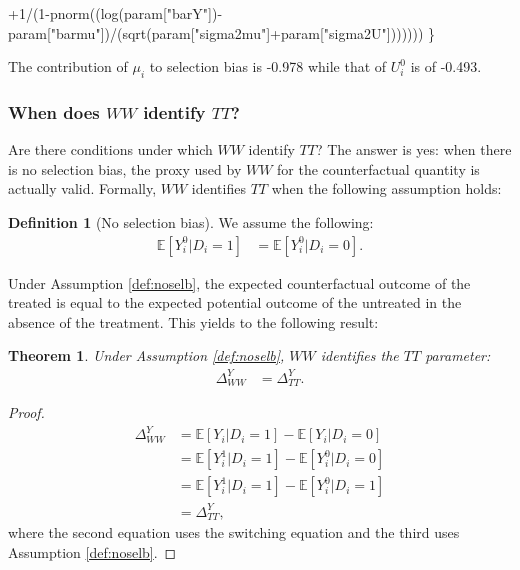 \documentclass[
]{book}
\newenvironment{Shaded}{\begin{snugshade}}{\end{snugshade}}
\newcommand{\DecValTok}[1]{\textcolor[rgb]{0.00,0.00,0.81}{#1}}
\newcommand{\FunctionTok}[1]{\textcolor[rgb]{0.00,0.00,0.00}{#1}}
\newcommand{\NormalTok}[1]{#1}
\newcommand{\SpecialCharTok}[1]{\textcolor[rgb]{0.00,0.00,0.00}{#1}}
\newcommand{\StringTok}[1]{\textcolor[rgb]{0.31,0.60,0.02}{#1}}
\newcommand{\esp}[1]{\mathbb{E}[ #1 ]}
\newtheorem{theorem}{Theorem}[chapter]
\theoremstyle{definition}
\newtheorem{definition}{Definition}[chapter]
\theoremstyle{definition}
\theoremstyle{definition}
\theoremstyle{definition}
\theoremstyle{remark}
\begin{document}
\begin{Shaded}
\begin{Highlighting}[]
           \SpecialCharTok{+}\DecValTok{1}\SpecialCharTok{/}\NormalTok{(}\DecValTok{1}\SpecialCharTok{{-}}\FunctionTok{pnorm}\NormalTok{((}\FunctionTok{log}\NormalTok{(param[}\StringTok{"barY"}\NormalTok{])}\SpecialCharTok{{-}}\NormalTok{param[}\StringTok{"barmu"}\NormalTok{])}\SpecialCharTok{/}\NormalTok{(}\FunctionTok{sqrt}\NormalTok{(param[}\StringTok{"sigma2mu"}\NormalTok{]}\SpecialCharTok{+}\NormalTok{param[}\StringTok{"sigma2U"}\NormalTok{]))))))}
\NormalTok{\}}
\end{Highlighting}
\end{Shaded}

The contribution of \(\mu_i\) to selection bias is -0.978 while that of \(U_i^0\) is of -0.493.

\hypertarget{when-does-ww-identify-tt}{%
\subsubsection{\texorpdfstring{When does \(WW\) identify \(TT\)?}{When does WW identify TT?}}\label{when-does-ww-identify-tt}}

Are there conditions under which \(WW\) identify \(TT\)?
The answer is yes: when there is no selection bias, the proxy used by \(WW\) for the counterfactual quantity is actually valid.
Formally, \(WW\) identifies \(TT\) when the following assumption holds:

\begin{definition}[No selection bias]
\protect\hypertarget{def:noselb}{}{\label{def:noselb} \iffalse (No selection bias) \fi{} }We assume the following:
\begin{align*}
\esp{Y_i^0|D_i=1} & = \esp{Y_i^0|D_i=0}.
\end{align*}
\end{definition}
Under Assumption \ref{def:noselb}, the expected counterfactual outcome of the treated is equal to the expected potential outcome of the untreated in the absence of the treatment.
This yields to the following result:

\begin{theorem}
\protect\hypertarget{thm:wwtt}{}{\label{thm:wwtt} }Under Assumption \ref{def:noselb}, \(WW\) identifies the \(TT\) parameter:
\begin{align*}
\Delta^Y_{WW} & = \Delta^Y_{TT}.
\end{align*}
\end{theorem}

\begin{proof}
\iffalse{} {Proof. } \fi{}\begin{align*}
\Delta^Y_{WW} & = \esp{Y_i|D_i=1}-\esp{Y_i|D_i=0}\\
              & = \esp{Y_i^1|D_i=1}-\esp{Y_i^0|D_i=0}\\
              & = \esp{Y_i^1|D_i=1}-\esp{Y_i^0|D_i=1} \\
              & = \Delta^Y_{TT},
\end{align*}
where the second equation uses the switching equation and the third uses Assumption \ref{def:noselb}.
\end{proof}
\end{document}
